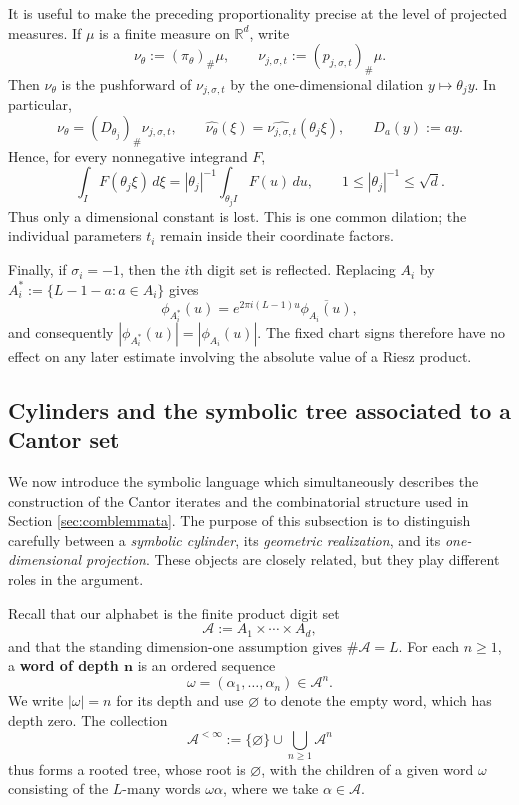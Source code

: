 \documentclass[12pt]{amsart}
\numberwithin{equation}{section}
\begin{document}
It is useful to make the preceding proportionality precise at the level of projected measures. If $\mu$ is a finite measure on $\mathbb{R}^d$, write
$$
\nu_{\theta}:=(\pi_{\theta})_{\#}\mu,
\qquad
\nu_{j,\sigma,t}:=(p_{j,\sigma,t})_{\#}\mu.
$$
Then $\nu_{\theta}$ is the pushforward of $\nu_{j,\sigma,t}$ by the one-dimensional dilation $y\mapsto\theta_jy$. In particular,
\begin{equation}\label{eq:chartmeasure-dilation}
 \nu_\theta=(D_{\theta_j})_\#\nu_{j,\sigma,t},
 \qquad
 \widehat{\nu_\theta}(\xi)
 =\widehat{\nu_{j,\sigma,t}}(\theta_j\xi),
 \qquad D_a(y):=ay.
\end{equation}
Hence, for every nonnegative integrand $F$,
\begin{equation}\label{eq:chartfrequency-dilation}
 \int_I F(\theta_j\xi)\,d\xi
 =|\theta_j|^{-1}\int_{\theta_j I}F(u)\,du,
 \qquad
 1\leq|\theta_j|^{-1}\leq\sqrt d.
\end{equation}
Thus only a dimensional constant is lost.  This is one common dilation; the
individual parameters $t_i$ remain inside their coordinate factors.

Finally, if $\sigma_i=-1$, then the $i$th digit set is reflected. Replacing $A_i$ by $A_i^*:=\{L-1-a:a\in A_i\}$ gives
$$
\phi_{A_i^*}(u)=e^{2\pi i(L-1)u}\overline{\phi_{A_i}(u)},
$$
and consequently $|\phi_{A_i^*}(u)|=|\phi_{A_i}(u)|$. The fixed chart signs therefore have no effect on any later estimate involving the absolute value of a Riesz product.


\subsection{Cylinders and the symbolic tree associated to a Cantor set}\label{subsec:cylindertree}

We now introduce the symbolic language which simultaneously describes the construction of the Cantor iterates and the combinatorial structure used in Section \ref{sec:comblemmata}. The purpose of this subsection is to distinguish carefully between a \textit{symbolic cylinder}, its \textit{geometric realization}, and its \textit{one-dimensional projection}. These objects are closely related, but they play different roles in the argument.

Recall that our alphabet is the finite product digit set
$$
\mathcal{A}:=A_1\times\cdots\times A_d,
$$
and that the standing dimension-one assumption gives $\#\mathcal{A}=L$. For each $n\geq1$, a \textbf{word of depth $\bm{n}$} is an ordered sequence
$$
\omega=(\alpha_1,\ldots,\alpha_n)\in\mathcal{A}^n.
$$
We write $|\omega|=n$ for its depth and use $\varnothing$ to denote the empty word, which has depth zero. The collection
$$
\mathcal{A}^{<\infty}:=\{\varnothing\}\cup\bigcup_{n\geq1}\mathcal{A}^n
$$
thus forms a rooted tree, whose root is $\varnothing$, with the children of a given word $\omega$ consisting of the $L$-many words $\omega\alpha$, where we take $\alpha\in\mathcal A$.
\end{document}
